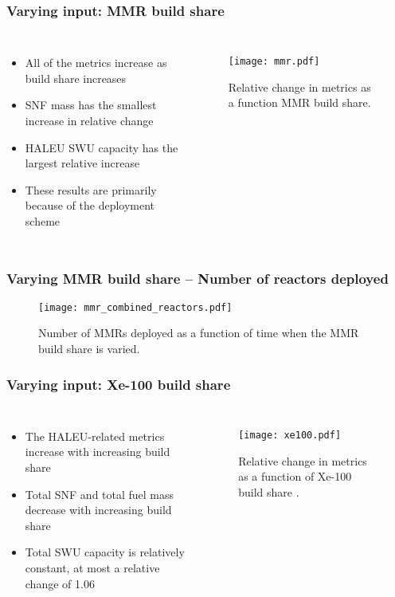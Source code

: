 \begin{frame}
    \frametitle{Varying input: MMR build share}
    \begin{columns}
        \column{4.5cm}
            \begin{itemize}
                \item All of the metrics increase as build share increases
                \item \gls{SNF} mass has the smallest increase in 
                      relative change
                \item \gls{HALEU} \gls{SWU} capacity has the largest relative increase 
                \item These results are primarily because of the deployment scheme    
            \end{itemize}
        \column{5.5cm}
            \begin{figure}
                \texttt{[image: mmr.pdf]}
                \caption{Relative change in metrics as a function MMR 
                build share.}
                \label{fig:mmr}
            \end{figure}

\end{columns}
\end{frame}

\begin{frame}
    \frametitle{Varying MMR build share -- Number of reactors deployed}
    \begin{figure}
        \centering
        \texttt{[image: mmr\_combined\_reactors.pdf]}
        \caption{Number of MMRs deployed as a function of time when the 
        MMR build share is varied.}
    \end{figure}
\end{frame}
\begin{frame}
    \frametitle{Varying input: Xe-100 build share}
    \begin{columns}
        \column{4.5cm}
            \begin{itemize}
                \item The \gls{HALEU}-related metrics increase
                      with increasing build share
                \item Total \gls{SNF} and total fuel mass decrease with 
                      increasing build share
                \item Total \gls{SWU} capacity is relatively constant, at most 
                      a relative change of 1.06
            \end{itemize}
        \column{5.5cm}
            \begin{figure}
                \texttt{[image: xe100.pdf]}
                \caption{Relative change in metrics as a function of Xe-100 
                build share \protect\cite{bachmann_sensitivity_2022}.}
                \label{fig:xe100}
            \end{figure}

\end{columns}
\end{frame}
   

